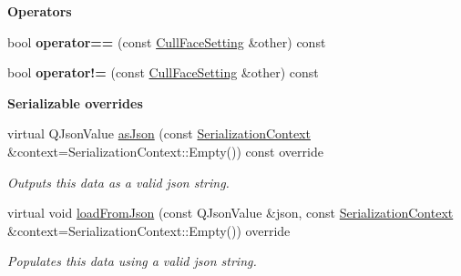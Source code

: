 \begin{Indent}\textbf{ Operators}\par
\begin{DoxyCompactItemize}
\item 
\mbox{\label{classrev_1_1_cull_face_setting_abdf523e8fa10dfdf4cc06ef3ff06cf3e}} 
bool {\bfseries operator==} (const \mbox{\hyperlink{classrev_1_1_cull_face_setting}{Cull\+Face\+Setting}} \&other) const
\item 
\mbox{\label{classrev_1_1_cull_face_setting_ac0f2135108ad7fb65c57a789a7e48a9b}} 
bool {\bfseries operator!=} (const \mbox{\hyperlink{classrev_1_1_cull_face_setting}{Cull\+Face\+Setting}} \&other) const
\end{DoxyCompactItemize}
\end{Indent}
\begin{Indent}\textbf{ Serializable overrides}\par
\begin{DoxyCompactItemize}
\item 
\mbox{\label{classrev_1_1_cull_face_setting_adec0fb89259acf298f7feb2e723f1a55}} 
virtual Q\+Json\+Value \mbox{\hyperlink{classrev_1_1_cull_face_setting_adec0fb89259acf298f7feb2e723f1a55}{as\+Json}} (const \mbox{\hyperlink{structrev_1_1_serialization_context}{Serialization\+Context}} \&context=Serialization\+Context\+::\+Empty()) const override
\begin{DoxyCompactList}\small\item\em Outputs this data as a valid json string. \end{DoxyCompactList}\item 
\mbox{\label{classrev_1_1_cull_face_setting_afeb749cd7203bb3873c14c05cf1a873c}} 
virtual void \mbox{\hyperlink{classrev_1_1_cull_face_setting_afeb749cd7203bb3873c14c05cf1a873c}{load\+From\+Json}} (const Q\+Json\+Value \&json, const \mbox{\hyperlink{structrev_1_1_serialization_context}{Serialization\+Context}} \&context=Serialization\+Context\+::\+Empty()) override
\begin{DoxyCompactList}\small\item\em Populates this data using a valid json string. \end{DoxyCompactList}\end{DoxyCompactItemize}
\end{Indent}
